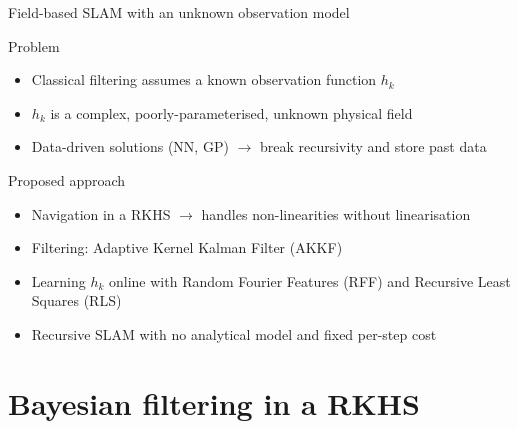 \documentclass[9pt]{beamer}
\begin{document}
\begin{frame}{Field-based SLAM with an unknown observation model}

\begin{block}{Problem}
    \begin{itemize}
    \item Classical filtering assumes a known observation function $h_k$
    \item $h_k$ is a complex, poorly-parameterised, unknown physical field
    \item Data-driven solutions (NN, GP) $\rightarrow$ break recursivity and store past data
    \end{itemize}
\end{block}

\begin{block}{Proposed approach}
    \begin{itemize}
    \item Navigation in a RKHS $\rightarrow$ handles non-linearities without linearisation
    \item Filtering: Adaptive Kernel Kalman Filter (AKKF)
    \item Learning $h_k$ online with Random Fourier Features (RFF) and Recursive Least Squares (RLS)
    \item[$\Rightarrow$]Recursive SLAM with no analytical model and fixed per-step cost
    \end{itemize}
\end{block}

\end{frame}

\section{Bayesian filtering in a RKHS}
\end{document}

